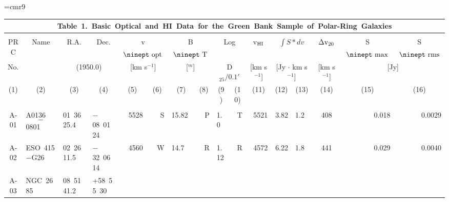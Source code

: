 
\pagestyle{empty}
\samepage
\font\ninept=cmr9
\hsize=10in
\vsize=6.5in
\hoffset-1.25in
\voffset-1.45in
\newcommand{\etal}{{\it et~al.}}                %
\newcommand{\KMS}{$\rm km\ s^{-1}$}
%
%
%
%    
\begin{tabular}{|c|l|ll|rr|lr|lr|r|rl|c|rr|}
\multicolumn{16}{c}{{\bf Table~1}.\ 
Basic~Optical~and~HI~Data~for~the~Green~Bank~Sample~of~Polar-Ring~Galaxies}\\ [4pt]\hline
&&&&&&&&&&&&&&&\\
\noalign{\vskip-6pt}
PRC&\multicolumn{1}{c|}{Name}&\multicolumn{1}{c}{R.A.}
&\multicolumn{1}{c|}{Dec.}&\multicolumn{2}{c|}{v$_{\hbox{\ninept opt}}$}
&\multicolumn{2}{c|}{B$_{\hbox{\ninept T}}$}&\multicolumn{2}{c|}{Log}
&\multicolumn{1}{c|}{v$_{\rm HI}$}&\multicolumn{2}{c|}{$\int S * dv$}
&\multicolumn{1}{c|}{$\Delta {\rm v_{20}}$}
&\multicolumn{1}{c}{S$_{\hbox{\ninept max}}$}
&\multicolumn{1}{c|}{S$_{\hbox{\ninept rms}}$}
\\
No.&&\multicolumn{2}{c|}{(1950.0)}
&\multicolumn{2}{c|}{[km s$^{-1}$]}
&\multicolumn{2}{c|}{[$^m$]}
&\multicolumn{2}{c|}{\hfil D$_{25} / 0.1'$\hfil}
&\multicolumn{1}{c|}{[km s$^{-1}$]}
&\multicolumn{2}{c|}{[Jy $\cdot$ km s$^{-1}$]}
&\multicolumn{1}{c|}{[km s$^{-1}$]}
&\multicolumn{2}{c|}{[Jy]}\\
(1)&\multicolumn{1}{c|}{(2)}&\multicolumn{1}{c}{(3)}
&\multicolumn{1}{c|}{(4)}&\multicolumn{1}{c}{(5)}&\multicolumn{1}{c|}{(6)}
&\multicolumn{1}{c}{(7)}&\multicolumn{1}{c|}{(8)}
&\multicolumn{1}{c}{(9)}&\multicolumn{1}{c|}{(10)}
&\multicolumn{1}{c|}{(11)}&\multicolumn{1}{c}{(12)}&\multicolumn{1}{c|}{(13)}
&\multicolumn{1}{c|}{(14)}&\multicolumn{1}{c}{(15)}&\multicolumn{1}{c|}{(16)}
\\ [4pt]\hline
&&&&&&&&&&&&&&&\\
\noalign{\vskip-6pt}
A-01&A0136$$-$$0801&01\ 36\ 25.4&$-$08\ 01\ 24
&5528&S&15.82&P&1.0&T&5521&3.82&
1.2&408&0.018&0.0029\\
A-02&ESO~415$-$G26&02\ 26\ 11.5&$-$32\ 06\ 14
&4560&W&14.7&R&1.12&R&4572&
6.22&1.8&441&0.029&0.0040\\
A-03&NGC~2685&08\ 51\ 41.2&+58\ 55\ 30

\end{tabular}
